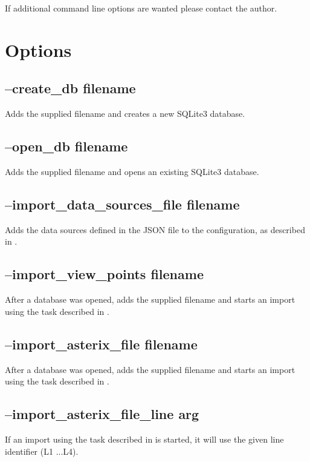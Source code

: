 If additional command line options are wanted please contact the author.

\section{Options}

\subsection{--create\_db filename}

Adds the supplied filename and creates a new SQLite3 database.
 
\subsection{--open\_db filename}

Adds the supplied filename and opens an existing SQLite3 database.

\subsection{--import\_data\_sources\_file filename}

Adds the data sources defined in the JSON file to the configuration, as described in .

\subsection{--import\_view\_points filename}

After a database was opened, adds the supplied filename and starts an import using the task described in .
 
\subsection{--import\_asterix\_file filename}

After a database was opened, adds the supplied filename and starts an import using the task described in .

\subsection{--import\_asterix\_file\_line arg}

If an import using the task described in  is started, it will use the given line identifier (L1 ...L4).


